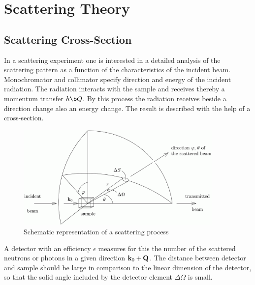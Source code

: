 \chapter{Scattering Theory}
\label{chap:basics}

\section{Scattering Cross-Section}
\label{crosssection}

In a scattering experiment one is interested in a detailed
analysis of the scattering pattern as a function of the
characteristics of the incident beam. Monochromator and collimator
specify direction and energy of the incident radiation.  The
radiation interacts with the sample and receives thereby a
momentum transfer $\hbar \B{Q}$. By this process the radiation
receives beside a direction change also an energy change. The
result is described with the help of a cross-section.

\begin{figure}[htb]
\begin{center}
\includegraphics[width=0.9\textwidth,height=0.45\textwidth]{EwaldSphereTeX.png}
\end{center}
\caption{Schematic representation of a scattering process}
\label{scatt2}
\end{figure}

A detector with an efficiency $\epsilon$ measures for this the
number of the scattered neutrons or photons in a given direction
${\bf k}_0+\bf Q$.  The distance between detector and sample
should be large in comparison to the linear dimension of the
detector, so that the solid angle included by the detector element
$\Delta\Omega$ is small.

